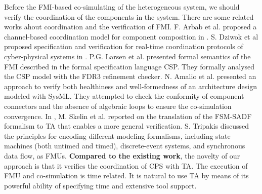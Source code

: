 Before the FMI-based co-simulating of the heterogeneous system, we should verify the coordination of the components in the system. There are some related works ahout coordination and the verification of FMI. F. Arbab et al. proposed a channel-based coordination model for component composition in \cite{Arbab2002Reo}. S. Dziwok et al proposed specification and verification for real-time coordination protocols of cyber-physical systems in \cite{Dziwok17}. P.G. Larsen et al. \cite{Larsen2016Integrated} presented formal semantics of the FMI described in the formal specification language CSP. They formally analysed the CSP model with the FDR3 refinement checker. N. Amalio et al. \cite{AmalioPCW16} presented an approach to verify both healthiness and well-formedness of an architecture design modeled with SysML. They attempted to check the conformity of component connectors and the absence of algebraic loops to ensure the co-simulation convergence.
In \cite{SkelinWOHL15}, M. Skelin et al. reported on the translation of the FSM-SADF formalism to TA that enables a more general verification. S. Tripakis \cite{Tripakis15} discussed the principles for encoding different modeling formalisms, including state machines (both untimed and timed), discrete-event systems, and synchronous data flow, as FMUs. 
\textbf{Compared to the existing work}, the novelty of our approach is that it verifies the coordination of CPS with TA. The execution of FMU and co-simulation is time related. It is natural to use TA by means of its powerful ability of specifying time and extensive tool support.


